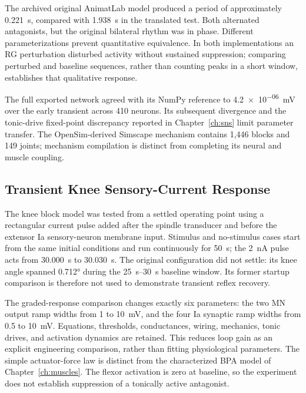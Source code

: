 The archived original AnimatLab model produced a period of approximately \qty{0.221}{\second}, compared with \qty{1.938}{\second} in the translated test. Both alternated antagonists, but the original bilateral rhythm was in phase. Different parameterizations prevent quantitative equivalence. In both implementations an RG perturbation disturbed activity without sustained suppression; comparing perturbed and baseline sequences, rather than counting peaks in a short window, establishes that qualitative response.

The full exported network agreed with its NumPy reference to \qty{4.2e-06}{\milli\volt} over the early transient across 410 neurons. Its subsequent divergence and the tonic-drive fixed-point discrepancy reported in Chapter~\ref{ch:sns} limit parameter transfer. The OpenSim-derived Simscape mechanism contains 1,446 blocks and 149 joints; mechanism compilation is distinct from completing its neural and muscle coupling.

\subsection{Transient Knee Sensory-Current Response}\label{sec:app_knee_transient}

The knee block model was tested from a settled operating point using a rectangular current pulse added after the spindle transducer and before the extensor Ia sensory-neuron membrane input. Stimulus and no-stimulus cases start from the same initial conditions and run continuously for \qty{50}{\second}; the \qty{2}{\nano\ampere} pulse acts from \qty{30.000}{\second} to \qty{30.030}{\second}. The original configuration did not settle: its knee angle spanned \ang{0.712} during the \qtyrange{25}{30}{\second} baseline window. Its former startup comparison is therefore not used to demonstrate transient reflex recovery.

The graded-response comparison changes exactly six parameters: the two MN output ramp widths from 1 to \qty{10}{\milli\volt}, and the four Ia synaptic ramp widths from 0.5 to \qty{10}{\milli\volt}. Equations, thresholds, conductances, wiring, mechanics, tonic drives, and activation dynamics are retained. This reduces loop gain as an explicit engineering comparison, rather than fitting physiological parameters. The simple actuator-force law is distinct from the characterized BPA model of Chapter~\ref{ch:muscles}. The flexor activation is zero at baseline, so the experiment does not establish suppression of a tonically active antagonist.

